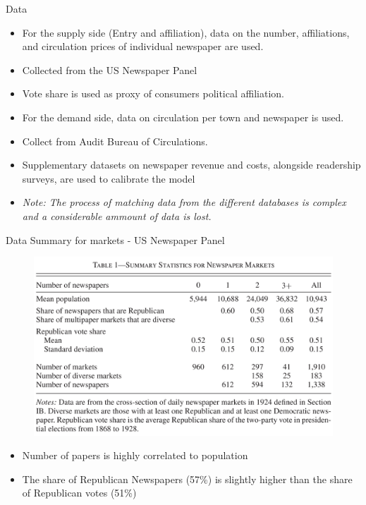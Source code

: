 \documentclass{beamer}
\begin{document}
\begin{frame}[t]{Data}
  \begin{itemize}
    \item For the supply side (Entry and affiliation), data on the number,
      affiliations, and circulation prices of individual newspaper are used.
      \item Collected from the US Newspaper Panel
    \item Vote share is used as proxy of consumers political affiliation.
    \item For the demand side, data on circulation per town and newspaper
      is used.
      \item Collect from Audit Bureau of Circulations.
    \item Supplementary datasets on newspaper revenue and costs, alongside 
      readership surveys, are used to calibrate the model
    \item \textit{Note: The process of matching data from the different databases
      is complex and a considerable ammount of data is lost.}
  \end{itemize}
\end{frame}

\begin{frame}[t]{Data Summary for markets - US Newspaper Panel}
  \begin{figure}
  \begin{center}
    \includegraphics[scale=0.14]{Table1.png}
  \end{center}
  \end{figure}

  \begin{itemize}
    \item Number of papers is highly correlated to population
    \item The share of Republican Newspapers (57\%) is slightly higher than
      the share of Republican votes (51\%)
  \end{itemize}
\end{frame}
\end{document}
